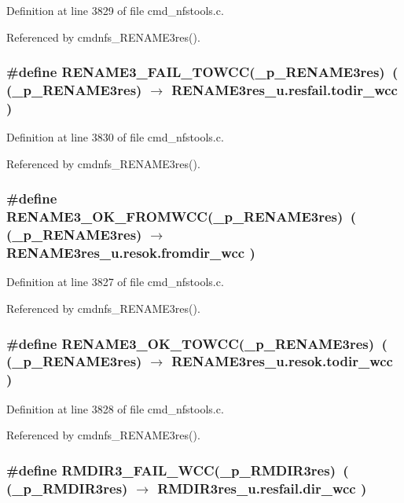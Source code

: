 Definition at line 3829 of file cmd\_\-nfstools.c.

Referenced by cmdnfs\_\-RENAME3res().
\subsubsection{\setlength{\rightskip}{0pt plus 5cm}\#define RENAME3\_\-FAIL\_\-TOWCC(\_\-p\_\-RENAME3res)\ ( (\_\-p\_\-RENAME3res) $\rightarrow$ RENAME3res\_\-u.resfail.todir\_\-wcc )}\label{cmd__nfstools_8c_a42}




Definition at line 3830 of file cmd\_\-nfstools.c.

Referenced by cmdnfs\_\-RENAME3res().
\subsubsection{\setlength{\rightskip}{0pt plus 5cm}\#define RENAME3\_\-OK\_\-FROMWCC(\_\-p\_\-RENAME3res)\ ( (\_\-p\_\-RENAME3res) $\rightarrow$ RENAME3res\_\-u.resok.fromdir\_\-wcc )}\label{cmd__nfstools_8c_a39}




Definition at line 3827 of file cmd\_\-nfstools.c.

Referenced by cmdnfs\_\-RENAME3res().
\subsubsection{\setlength{\rightskip}{0pt plus 5cm}\#define RENAME3\_\-OK\_\-TOWCC(\_\-p\_\-RENAME3res)\ ( (\_\-p\_\-RENAME3res) $\rightarrow$ RENAME3res\_\-u.resok.todir\_\-wcc )}\label{cmd__nfstools_8c_a40}




Definition at line 3828 of file cmd\_\-nfstools.c.

Referenced by cmdnfs\_\-RENAME3res().
\subsubsection{\setlength{\rightskip}{0pt plus 5cm}\#define RMDIR3\_\-FAIL\_\-WCC(\_\-p\_\-RMDIR3res)\ ( (\_\-p\_\-RMDIR3res) $\rightarrow$ RMDIR3res\_\-u.resfail.dir\_\-wcc )}\label{cmd__nfstools_8c_a36}




